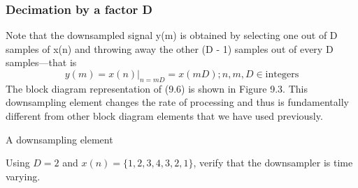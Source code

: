 \documentclass{article}
\begin{document}
\subsubsection{Decimation by a factor D}
Note that the downsampled signal y(m) is obtained by selecting one out
of D samples of x(n) and throwing away the other (D - 1) samples out
of every D samples—that is
\begin{equation}
y(m) = x(n)|_{n=mD}=x(mD); n,m,D \in \text{integers}
\end{equation}
The block diagram representation of (9.6) is shown in Figure 9.3. This
downsampling element changes the rate of processing and thus is fundamentally different from other block diagram elements that we have used previously.

\vspace{1em}

A downsampling element \\
\vspace{1em}

Using $D = 2$ and $x(n) = \{1, 2, 3, 4, 3, 2, 1 \}$, verify that the downsampler is time
varying.
\end{document}
